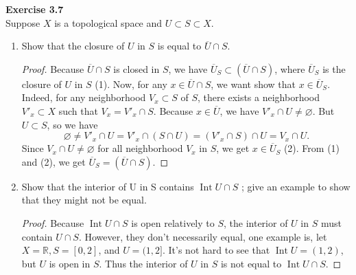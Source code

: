 \documentclass[12pt, a4paper]{article}
\theoremstyle{plain}
\newcommand{\R}{\mathbb{R}}
\DeclareMathOperator{\inter}{Int}
\newenvironment{exercise}[2][Exercise]
    { \begin{mdframed}[backgroundcolor=gray!20] \textbf{#1 #2} \\}
    {  \end{mdframed}}
\begin{document}
\begin{exercise}{3.7}
Suppose $X$ is a topological space and $U\subset S\subset X$.
\begin{enumerate}[label=(\alph*)]
\item Show that the closure of $U$ in $S$ is equal to $\overline{U}\cap S$.
	\begin{proof}
	Because $\overline{U}\cap S$ is closed in $S$, we have $\overline{U}_S\subset (\overline{U}\cap S)$, where $\overline{U}_S$ is the closure of $U$ in $S$ (1). Now, for any $x\in \overline{U}\cap S$, we want show that $x\in \overline{U}_S$. Indeed, for any neighborhood $V_x\subset S$ of $S$, there exists a neighborhood $V'_x\subset X$ such that $V_x=V'_x\cap S$. Because $x\in\overline{U}$, we have $V'_x\cap U\neq\varnothing$. But $U\subset S$, so we have
	\[
	\varnothing \neq V'_x\cap U=V'_x\cap (S\cap U)=(V'_x\cap S)\cap U=V_x\cap U.
	\]
	Since $V_x\cap U\neq \varnothing$ for all neighborhood $V_x$ in $S$, we get $x\in \overline{U}_S$ (2). From (1) and (2), we get $\overline{U}_S=(\overline{U}\cap S)$.
	\end{proof}

\item Show that the interior of U in S contains $\inter U \cap S$ ; give an example to show that
they might not be equal.
	\begin{proof}
	Because $\inter{U}\cap S$ is open relatively to $S$, the interior of $U$ in $S$ must contain $U\cap S$. However, they don't necessarily equal, one example is, let $X=\R,S=[0,2]$, and $U=(1,2]$. It's not hard to see that $\inter{U}=(1,2)$, but $U$ is open in $S$. Thus the interior of $U$ in $S$ is not equal to $\inter{U}\cap S$.  
	\end{proof}
\end{enumerate}
\end{exercise}
	
\end{document}
